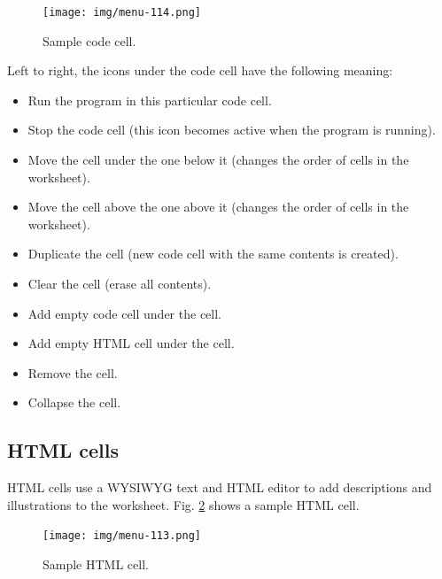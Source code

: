 \begin{figure}[!ht]
\begin{center}
\texttt{[image: img/menu-114.png]}
\caption{Sample code cell.}
\label{fig:menu-111}
\end{center}
\end{figure}

\noindent
Left to right, the icons under the code cell have the following meaning: 
\begin{itemize}
\item Run the program in this particular code cell.
\item Stop the code cell (this icon becomes active when the program is running).
\item Move the cell under the one below it (changes the order of cells in the worksheet).
\item Move the cell above the one above it (changes the order of cells in the worksheet).
\item Duplicate the cell (new code cell with the same contents is created).
\item Clear the cell (erase all contents).
\item Add empty code cell under the cell.
\item Add empty HTML cell under the cell.
\item Remove the cell.
\item Collapse the cell. 
\end{itemize}

\subsection{HTML cells}

HTML cells use a WYSIWYG text and HTML editor 
to add descriptions and illustrations to the worksheet. Fig. 
\ref{fig:menu-112} shows a sample HTML cell.

\begin{figure}[!ht]
\begin{center}
\texttt{[image: img/menu-113.png]}
\vspace{-0mm}
\caption{Sample HTML cell.}
\label{fig:menu-112}
\end{center}
\end{figure}
\noindent

